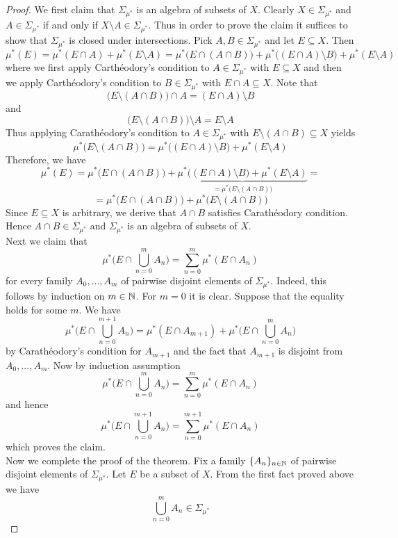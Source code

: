 \begin{proof}
We first claim that $\Sigma_{\mu^*}$ is an algebra of subsets of $X$. Clearly $X \in \Sigma_{\mu^*}$ and $A \in \Sigma_{\mu^*}$ if and only if $X\setminus A \in \Sigma_{\mu^*}$. Thus in order to prove the claim it suffices to show that $\Sigma_{\mu^*}$ is closed under intersections. Pick $A,B\in \Sigma_{\mu^*}$ and let $E \subseteq X$. Then
$$\mu^*(E) = \mu^*(E\cap A) + \mu^*(E\setminus A) = \mu^*\big(E\cap (A\cap B)\big) + \mu^*\big((E\cap A) \setminus B\big) + \mu^*(E\setminus A)$$
where we first apply Carth{\'e}odory's condition to $A \in \Sigma_{\mu^*}$ with $E\subseteq X$ and then we apply Carth{\'e}odory's condition to $B\in \Sigma_{\mu^*}$ with $E\cap A\subseteq X$. Note that
$$\big(E\setminus (A \cap B)\big)\cap A = (E\cap A) \setminus B$$
and
$$\big(E\setminus (A\cap B)\big)\setminus A = E\setminus A$$
Thus applying Carath{\'e}odory's condition to $A\in \Sigma_{\mu^*}$ with $E\setminus (A\cap B)\subseteq X$ yields
$$\mu^*\big(E\setminus (A\cap B)\big) = \mu^*\big((E\cap A) \setminus B\big) + \mu^*(E\setminus A)$$
Therefore, we have
$$\mu^*(E) = \mu^*\big(E\cap (A\cap B)\big) + \underbrace{\mu^*\big((E\cap A) \setminus B\big) + \mu^*(E\setminus A)}_{=\mu^*\big(E\setminus (A\cap B)\big)} = $$
$$=\mu^*\big(E\cap (A\cap B)\big) + \mu^*\big(E\setminus (A\cap B)\big)$$
Since $E\subseteq X$ is arbitrary, we derive that $A\cap B$ satisfies Carath{\'e}odory condition. Hence $A\cap B \in \Sigma_{\mu^*}$ and $\Sigma_{\mu^*}$ is an algebra of subsets of $X$.\\
Next we claim that 
$$\mu^*\bigg(E\cap \bigcup_{n=0}^mA_n\bigg) = \sum_{n=0}^m\mu^*(E\cap A_n)$$
for every family $A_0,...,A_m$ of pairwise disjoint elements of $\Sigma_{\mu^*}$. Indeed, this follows by induction on $m \in {\mathbb N}$. For $m = 0$ it is clear. Suppose that the equality holds for some $m$. We have
$$\mu^*\bigg(E\cap \bigcup_{n=0}^{m+1}A_n\bigg) = \mu^*(E\cap A_{m+1}) + \mu^*\bigg(E\cap \bigcup_{n=0}^mA_n\bigg)
$$
by Carath{\'e}odory's condition for $A_{m+1}$ and the fact that $A_{m+1}$ is disjoint from $A_0,...,A_m$. Now by induction assumption
$$\mu^*\bigg(E\cap \bigcup_{n=0}^mA_n\bigg) = \sum_{n=0}^m\mu^*(E\cap A_n)$$
and hence
$$\mu^*\bigg(E\cap \bigcup_{n=0}^{m+1}A_n\bigg) = \sum_{n=0}^{m+1}\mu^*(E\cap A_n)$$
which proves the claim.\\
Now we complete the proof of the theorem. Fix a family $\{A_n\}_{n\in {\mathbb N}}$ of pairwise disjoint elements of $\Sigma_{\mu^*}$. Let $E$ be a subset of $X$. From the first fact proved above we have
$$\bigcup_{n=0}^mA_n \in \Sigma_{\mu^*}$$

\end{proof}
